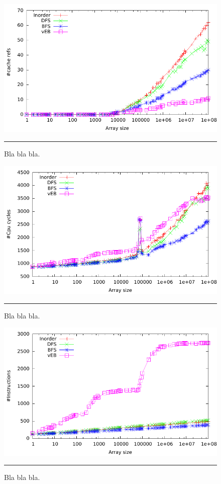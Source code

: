 \begin{figure}[htbp]
	\centering
		\includegraphics[width=\textwidth]{./Figures/Project1/Cache_refs.pdf}
		\rule{35em}{0.5pt}
	\caption[Cache refs]{
	Bla bla bla.
	}
	\label{fig:Cache_refs}
\end{figure}



\begin{figure}[htbp]
	\centering
		\includegraphics[width=\textwidth]{./Figures/Project1/Cpu_cycles.pdf}
		\rule{35em}{0.5pt}
	\caption[CPU cycles]{
	Bla bla bla.
	}
	\label{fig:Cpu_cycles}
\end{figure}


\begin{figure}[htbp]
	\centering
		\includegraphics[width=\textwidth]{./Figures/Project1/Instructions.pdf}
		\rule{35em}{0.5pt}
	\caption[Instructions]{
	Bla bla bla.
	}
	\label{fig:Instructions}
\end{figure}

